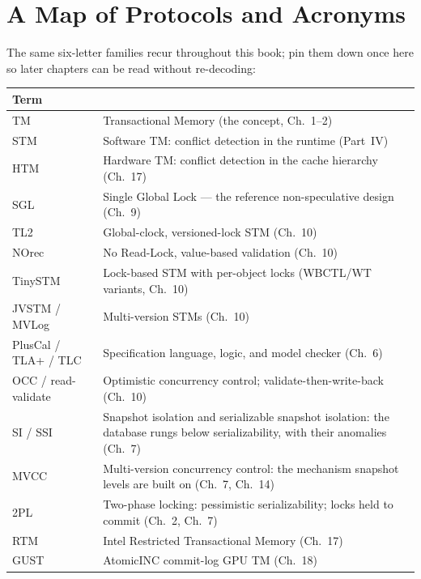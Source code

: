 \chapter*{A Map of Protocols and Acronyms}
The same six-letter families recur throughout this book; pin them down once
here so later chapters can be read without re-decoding:

\begin{center}
\begin{tabular}{lM{4.2in}}
\textbf{Term} &  \\
\hline
TM & Transactional Memory (the concept, Ch.~1--2) \\
STM & Software TM: conflict detection in the runtime (Part~IV) \\
HTM & Hardware TM: conflict detection in the cache hierarchy (Ch.~17) \\
SGL & Single Global Lock --- the reference non-speculative design (Ch.~9) \\
TL2 & Global-clock, versioned-lock STM (Ch.~10) \\
NOrec & No Read-Lock, value-based validation (Ch.~10) \\
TinySTM & Lock-based STM with per-object locks (WBCTL/WT variants, Ch.~10) \\
JVSTM / MVLog & Multi-version STMs (Ch.~10) \\
PlusCal / TLA+ / TLC & Specification language, logic, and model checker (Ch.~6) \\
OCC / read-validate & Optimistic concurrency control; validate-then-write-back (Ch.~10) \\
SI / SSI & Snapshot isolation and serializable snapshot isolation: the database rungs below serializability, with their anomalies (Ch.~7) \\
MVCC & Multi-version concurrency control: the mechanism snapshot levels are built on (Ch.~7, Ch.~14) \\
2PL & Two-phase locking: pessimistic serializability; locks held to commit (Ch.~2, Ch.~7) \\
RTM & Intel Restricted Transactional Memory (Ch.~17) \\
GUST & AtomicINC commit-log GPU TM (Ch.~18) \\
\end{tabular}
\end{center}

